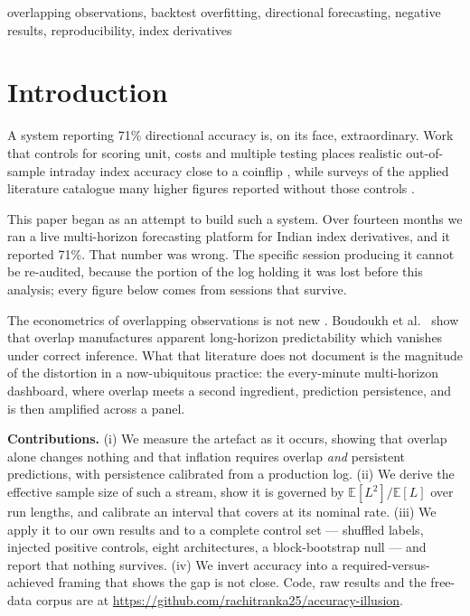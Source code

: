 \documentclass[conference]{IEEEtran}
\begin{document}
\begin{IEEEkeywords}
overlapping observations, backtest overfitting, directional forecasting,
negative results, reproducibility, index derivatives
\end{IEEEkeywords}

\section{Introduction}

A system reporting 71\% directional accuracy is, on its face, extraordinary.
Work that controls for scoring unit, costs and multiple testing places realistic
out-of-sample intraday index accuracy close to a coinflip
\cite{timmermann2004,sullivan1999}, while surveys of the applied literature
catalogue many higher figures reported without those controls \cite{sezer2020}.

This paper began as an attempt to build such a system. Over fourteen months we
ran a live multi-horizon forecasting platform for Indian index derivatives, and
it reported 71\%. That number was wrong. The specific session producing it
cannot be re-audited, because the portion of the log holding it was lost before
this analysis; every figure below comes from sessions that survive.

The econometrics of overlapping observations is not new
\cite{hansen1980,richardson1991}. Boudoukh et al.\ \cite{boudoukh2008} show that
overlap manufactures apparent long-horizon predictability which vanishes under
correct inference. What that literature does not document is the magnitude of
the distortion in a now-ubiquitous practice: the every-minute multi-horizon
dashboard, where overlap meets a second ingredient, prediction persistence, and
is then amplified across a panel.

\textbf{Contributions.} (i) We measure the artefact as it occurs, showing that
overlap alone changes nothing and that inflation requires overlap \emph{and}
persistent predictions, with persistence calibrated from a production log.
(ii) We derive the effective sample size of such a stream, show it is governed
by $\mathbb{E}[L^2]/\mathbb{E}[L]$ over run lengths, and calibrate an interval
that covers at its nominal rate. (iii) We apply it to our own results and to a
complete control set --- shuffled labels, injected positive controls, eight
architectures, a block-bootstrap null --- and report that nothing survives.
(iv) We invert accuracy into a required-versus-achieved framing that shows the
gap is not close. Code, raw results and the free-data corpus are at
\url{https://github.com/rachitranka25/accuracy-illusion}.
\end{document}
